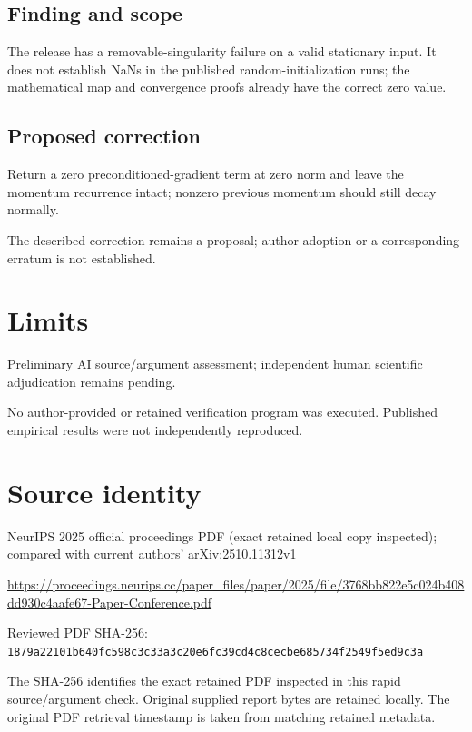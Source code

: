 \documentclass[11pt]{article}
\begin{document}
\subsection*{Finding and scope}

The release has a removable-singularity failure on a valid stationary input. It does not establish NaNs in the published random-initialization runs; the mathematical map and convergence proofs already have the correct zero value.

\subsection*{Proposed correction}

Return a zero preconditioned-gradient term at zero norm and leave the momentum recurrence intact; nonzero previous momentum should still decay normally.

The described correction remains a proposal; author adoption or a corresponding erratum is not established.

\section*{Limits}

Preliminary AI source/argument assessment; independent human scientific adjudication remains pending.\par

No author-provided or retained verification program was executed. Published empirical results were not independently reproduced.\par

\section*{Source identity}

NeurIPS 2025 official proceedings PDF (exact retained local copy inspected); compared with current authors’ arXiv:2510.11312v1

\url{https://proceedings.neurips.cc/paper_files/paper/2025/file/3768bb822e5c024b408dd930c4aafe67-Paper-Conference.pdf}

Reviewed PDF SHA-256: \nolinkurl{1879a22101b640fc598c3c33a3c20e6fc39cd4c8cecbe685734f2549f5ed9c3a}

The SHA-256 identifies the exact retained PDF inspected in this rapid source/argument check. Original supplied report bytes are retained locally. The original PDF retrieval timestamp is taken from matching retained metadata.
\end{document}
